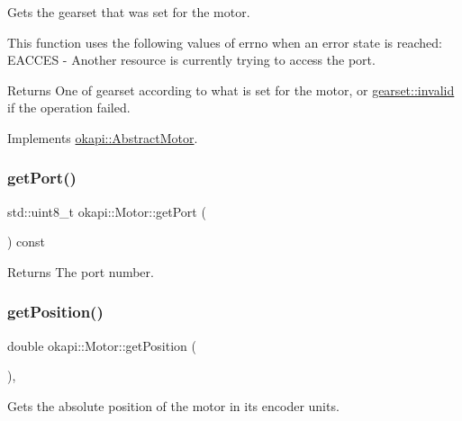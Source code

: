 Gets the gearset that was set for the motor.

This function uses the following values of errno when an error state is reached\+: E\+A\+C\+C\+ES -\/ Another resource is currently trying to access the port.

\begin{DoxyReturn}{Returns}
One of gearset according to what is set for the motor, or \mbox{\hyperlink{classokapi_1_1AbstractMotor_a88aaa6ea2fa10f5520a537bbf26774d5afedb2d84cafe20862cb4399751a8a7e3}{gearset\+::invalid}} if the operation failed. 
\end{DoxyReturn}


Implements \mbox{\hyperlink{classokapi_1_1AbstractMotor_adc90f1fc8af6c34c4e833355693474bb}{okapi\+::\+Abstract\+Motor}}.

\mbox{\label{classokapi_1_1Motor_ac1f1ac84ac7a96dab84cc0c0023a2ae4}} 
\subsubsection{\texorpdfstring{getPort()}{getPort()}}
{\footnotesize\ttfamily std\+::uint8\+\_\+t okapi\+::\+Motor\+::get\+Port (\begin{DoxyParamCaption}{ }\end{DoxyParamCaption}) const}

\begin{DoxyReturn}{Returns}
The port number. 
\end{DoxyReturn}
\mbox{\label{classokapi_1_1Motor_a4592f8a1cce4474f85ceabd3d7e2fe0b}} 
\subsubsection{\texorpdfstring{getPosition()}{getPosition()}}
{\footnotesize\ttfamily double okapi\+::\+Motor\+::get\+Position (\begin{DoxyParamCaption}{ }\end{DoxyParamCaption})\hspace{0.3cm}{\ttfamily [override]}, {\ttfamily [virtual]}}

Gets the absolute position of the motor in its encoder units.

